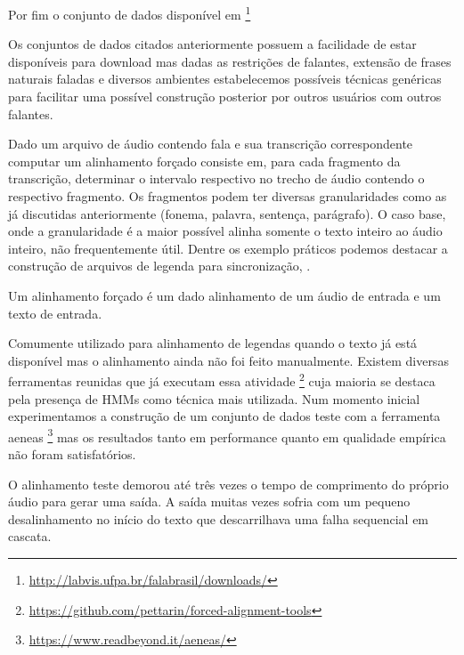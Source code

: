 Por fim o conjunto de dados disponível em \footnote{\url{http://labvis.ufpa.br/falabrasil/downloads/}}




Os conjuntos de dados citados anteriormente possuem a facilidade de estar disponíveis para download mas dadas as restrições de falantes, extensão de frases naturais faladas e diversos ambientes estabelecemos possíveis técnicas genéricas para facilitar uma possível construção posterior por outros usuários com outros falantes. 

Dado um arquivo de áudio contendo fala e sua transcrição correspondente computar um alinhamento forçado consiste em, para cada fragmento da transcrição, determinar o intervalo respectivo no trecho de áudio contendo o respectivo fragmento. Os fragmentos podem ter diversas granularidades como as já discutidas anteriormente (fonema, palavra, sentença, parágrafo). O caso base, onde a granularidade é a maior possível alinha somente o texto inteiro ao áudio inteiro, não frequentemente útil. Dentre os exemplo práticos podemos destacar a construção de arquivos de legenda para sincronização, .

Um alinhamento forçado é um dado alinhamento de um áudio de entrada e um texto de entrada. 

Comumente utilizado para alinhamento de legendas quando o texto já está disponível mas o alinhamento ainda não foi feito manualmente. Existem diversas ferramentas reunidas que já executam essa atividade \footnote{\url{https://github.com/pettarin/forced-alignment-tools}} cuja maioria se destaca pela presença de HMMs como técnica mais utilizada. Num momento inicial experimentamos a construção de um conjunto de dados teste com a ferramenta aeneas \footnote{\url{https://www.readbeyond.it/aeneas/}} mas os resultados tanto em performance quanto em qualidade empírica não foram satisfatórios. 

O alinhamento teste demorou até três vezes o tempo de comprimento do próprio áudio para gerar uma saída. A saída muitas vezes sofria com um pequeno desalinhamento no início do texto que descarrilhava uma falha sequencial em cascata.



